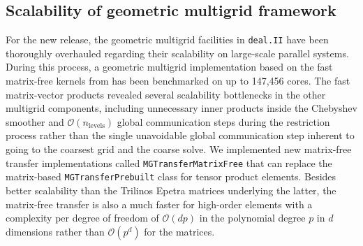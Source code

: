 \documentclass{ansarticle-preprint}
\newcommand{\specialword}[1]{\texttt{#1}}
\newcommand{\dealii}{{\specialword{deal.II}}}
\begin{document}
\subsection{Scalability of geometric multigrid framework}

For the new release, the geometric multigrid facilities in \dealii{} have been
thoroughly overhauled regarding their scalability on large-scale parallel
systems. During this process, a geometric multigrid implementation based on
the fast matrix-free kernels from \cite{KronbichlerKormann2012} has been
benchmarked on up to 147,456 cores. The fast matrix-vector products revealed
several scalability bottlenecks in the other multigrid components, including
unnecessary inner products inside the Chebyshev smoother and
${\mathcal O}(n_\text{levels})$ global communication steps during the
restriction process rather than the single unavoidable global communication
step inherent to going to the coarsest grid and the coarse solve. We
implemented new
matrix-free transfer implementations called \texttt{MGTransferMatrixFree}
that can replace the matrix-based \texttt{MGTransferPrebuilt} class
for tensor product elements. Besides better scalability than the Trilinos
Epetra matrices underlying the latter, the matrix-free transfer is also a much
faster for high-order elements with a complexity per degree of freedom of
$\mathcal O(d p)$ in the polynomial degree $p$ in $d$ dimensions rather than
$\mathcal O(p^d)$ for the matrices.
\end{document}
